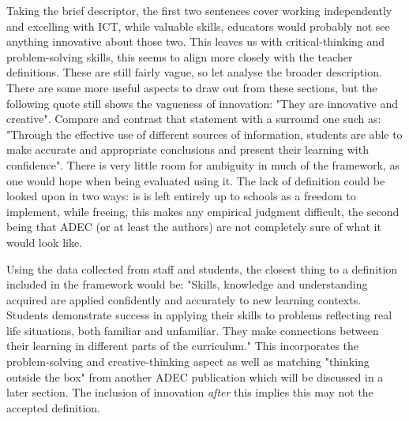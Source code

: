 Taking the brief descriptor, the first two sentences cover working independently and excelling with ICT, while valuable skills, educators would probably not see anything innovative about those two. This leaves us with critical-thinking and problem-solving skills, this seems to align more closely with the teacher definitions. These are still fairly vague, so let analyse the broader description. There are some more useful aspects to draw out from these sections, but the following quote still shows the vagueness of innovation: "They are innovative and creative". Compare and contrast that statement with a surround one such as: "Through the effective use of different sources of information, students are able to make accurate and appropriate conclusions and present their learning with confidence". There is very little room for ambiguity in much of the framework, as one would hope when being evaluated using it. The lack of definition could be looked upon in two ways: is is left entirely up to schools as a freedom to implement, while freeing, this makes any empirical judgment difficult, the second being that ADEC (or at least the authors) are not completely sure of what it would look like.

Using the data collected from staff and students, the closest thing to a definition included in the framework would be: "Skills, knowledge and understanding acquired are applied confidently and accurately to new learning contexts. Students demonstrate success in applying their skills to problems reflecting real life situations, both familiar and unfamiliar. They make connections between their learning in different parts of the curriculum." This incorporates the problem-solving and creative-thinking aspect as well as matching "thinking outside the box" from another ADEC publication which will be discussed in a later section. The inclusion of innovation \textit{after} this implies this may not the accepted definition.

